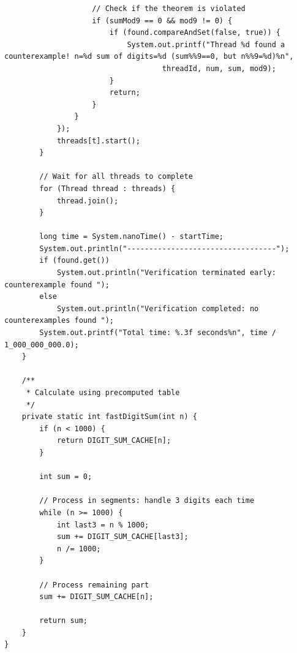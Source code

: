 \documentclass[12pt,a4paper]{article}
\begin{document}
\begin{lstlisting}
                    // Check if the theorem is violated
                    if (sumMod9 == 0 && mod9 != 0) {
                        if (found.compareAndSet(false, true)) {
                            System.out.printf("Thread %d found a counterexample! n=%d sum of digits=%d (sum%%9==0, but n%%9=%d)%n",
                                    threadId, num, sum, mod9);
                        }
                        return;
                    }
                }
            });
            threads[t].start();
        }

        // Wait for all threads to complete
        for (Thread thread : threads) {
            thread.join();
        }

        long time = System.nanoTime() - startTime;
        System.out.println("----------------------------------");
        if (found.get())
            System.out.println("Verification terminated early: counterexample found ");
        else
            System.out.println("Verification completed: no counterexamples found ");
        System.out.printf("Total time: %.3f seconds%n", time / 1_000_000_000.0);
    }

    /**
     * Calculate using precomputed table
     */
    private static int fastDigitSum(int n) {
        if (n < 1000) {
            return DIGIT_SUM_CACHE[n];
        }
        
        int sum = 0;
        
        // Process in segments: handle 3 digits each time
        while (n >= 1000) {
            int last3 = n % 1000;
            sum += DIGIT_SUM_CACHE[last3];
            n /= 1000;
        }
        
        // Process remaining part
        sum += DIGIT_SUM_CACHE[n];
        
        return sum;
    }
}
\end{lstlisting}
\end{document}
